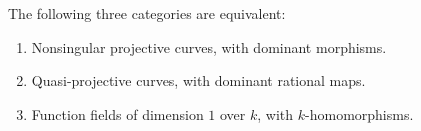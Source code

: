 The following three categories are equivalent:

\begin{enumerate}
  \item[(i)] Nonsingular projective curves, with dominant morphisms.
  \item[(ii)] Quasi-projective curves, with dominant rational maps.
  \item[(iii)] Function fields of dimension $1$ over $k$, with $k$-homomorphisms.
\end{enumerate}

